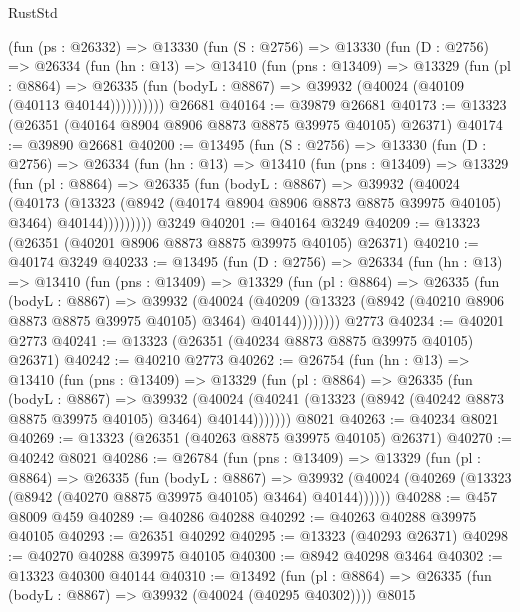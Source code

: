 \begin{lexlean}{RustStd}
\begin{coremodule}
    (fun (ps : @26332) =>
    @13330
      (fun (S : @2756) =>
      @13330
        (fun (D : @2756) =>
        @26334
          (fun (hn : @13) =>
          @13410
            (fun (pns : @13409) =>
            @13329
              (fun (pl : @8864) =>
              @26335 (fun (bodyL : @8867) => @39932 (@40024 (@40109 (@40113 @40144))))))))))
    @26681
@40164 := @39879 @26681
@40173 := @13323 (@26351 (@40164 @8904 @8906 @8873 @8875 @39975 @40105) @26371)
@40174 := @39890 @26681
@40200 := @13495
    (fun (S : @2756) =>
    @13330
      (fun (D : @2756) =>
      @26334
        (fun (hn : @13) =>
        @13410
          (fun (pns : @13409) =>
          @13329
            (fun (pl : @8864) =>
            @26335
              (fun (bodyL : @8867) =>
              @39932
                (@40024
                  (@40173
                    (@13323
                      (@8942 (@40174 @8904 @8906 @8873 @8875 @39975 @40105) @3464)
                      @40144)))))))))
    @3249
@40201 := @40164 @3249
@40209 := @13323 (@26351 (@40201 @8906 @8873 @8875 @39975 @40105) @26371)
@40210 := @40174 @3249
@40233 := @13495
    (fun (D : @2756) =>
    @26334
      (fun (hn : @13) =>
      @13410
        (fun (pns : @13409) =>
        @13329
          (fun (pl : @8864) =>
          @26335
            (fun (bodyL : @8867) =>
            @39932
              (@40024
                (@40209
                  (@13323 (@8942 (@40210 @8906 @8873 @8875 @39975 @40105) @3464) @40144))))))))
    @2773
@40234 := @40201 @2773
@40241 := @13323 (@26351 (@40234 @8873 @8875 @39975 @40105) @26371)
@40242 := @40210 @2773
@40262 := @26754
    (fun (hn : @13) =>
    @13410
      (fun (pns : @13409) =>
      @13329
        (fun (pl : @8864) =>
        @26335
          (fun (bodyL : @8867) =>
          @39932
            (@40024 (@40241 (@13323 (@8942 (@40242 @8873 @8875 @39975 @40105) @3464) @40144)))))))
    @8021
@40263 := @40234 @8021
@40269 := @13323 (@26351 (@40263 @8875 @39975 @40105) @26371)
@40270 := @40242 @8021
@40286 := @26784
    (fun (pns : @13409) =>
    @13329
      (fun (pl : @8864) =>
      @26335
        (fun (bodyL : @8867) =>
        @39932 (@40024 (@40269 (@13323 (@8942 (@40270 @8875 @39975 @40105) @3464) @40144))))))
@40288 := @457 @8009 @459
@40289 := @40286 @40288
@40292 := @40263 @40288 @39975 @40105
@40293 := @26351 @40292
@40295 := @13323 (@40293 @26371)
@40298 := @40270 @40288 @39975 @40105
@40300 := @8942 @40298 @3464
@40302 := @13323 @40300 @40144
@40310 := @13492
    (fun (pl : @8864) => @26335 (fun (bodyL : @8867) => @39932 (@40024 (@40295 @40302))))
    @8015

\end{coremodule}
\end{lexlean}
